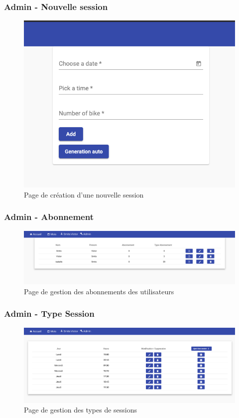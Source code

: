 	\subsubsection{Admin - Nouvelle session}
		\begin{figure}[h!]
       	 	\includegraphics[width=0.8\linewidth, center]{Mockup/Admin-Nouvelle-Session.png}
       	 	\caption{Page de création d'une nouvelle session}
       	\end{figure}
       	
	\vspace{\baselineskip}
	\subsubsection{Admin - Abonnement}
		\begin{figure}[h!]
       	 	\includegraphics[width=0.8\linewidth, center]{Mockup/Admin-Abonnement.png}
       	 	\caption{Page de gestion des abonnements des utilisateurs}
       	\end{figure}
       	
	
	\newpage
	\subsubsection{Admin - Type Session}
		\begin{figure}[h!]
       	 	\includegraphics[width=0.8\linewidth, center]{Mockup/Admin-Type-Session.png}
       	 	\caption{Page de gestion des types de sessions}
       	\end{figure}

